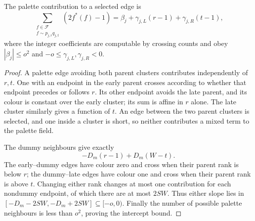 \begin{lemma}\label{lem:affine-palette}
The palette contribution to a selected edge is
\begin{equation}\label{eq:affine-palette}
\sum_{\substack{f\in\mathcal F\\f\sim p_{j,r}q_{j,t}}}(2f^*(f)-1)
=\beta_j+\gamma_{j,L}(r-1)+\gamma_{j,R}(t-1),
\end{equation}
where the integer coefficients are computable by crossing counts and obey
$|\beta_j|\leq o^2$ and $-o\leq\gamma_{j,L},\gamma_{j,R}<0$.
\end{lemma}
\begin{proof}
A palette edge avoiding both parent clusters contributes independently of $r,t$. One with an endpoint in the early parent crosses according to whether that endpoint precedes or follows $r$. Its other endpoint avoids the late parent, and its colour is constant over the early cluster; its sum is affine in $r$ alone. The late cluster similarly gives a function of $t$. An edge between the two parent clusters is selected, and one inside a cluster is short, so neither contributes a mixed term to the palette field.

The dummy neighbours give exactly
\[
-D_m(r-1)+D_m(W-t).
\]
The early--dummy edges have colour zero and cross when their parent rank is below $r$; the dummy--late edges have colour one and cross when their parent rank is above $t$. Changing either rank changes at most one contribution for each nondummy endpoint, of which there are at most $2SW$. Thus either slope lies in
$[-D_m-2SW,-D_m+2SW]\subseteq[-o,0)$. Finally the number of possible palette neighbours is less than $o^2$, proving the intercept bound.
\end{proof}

